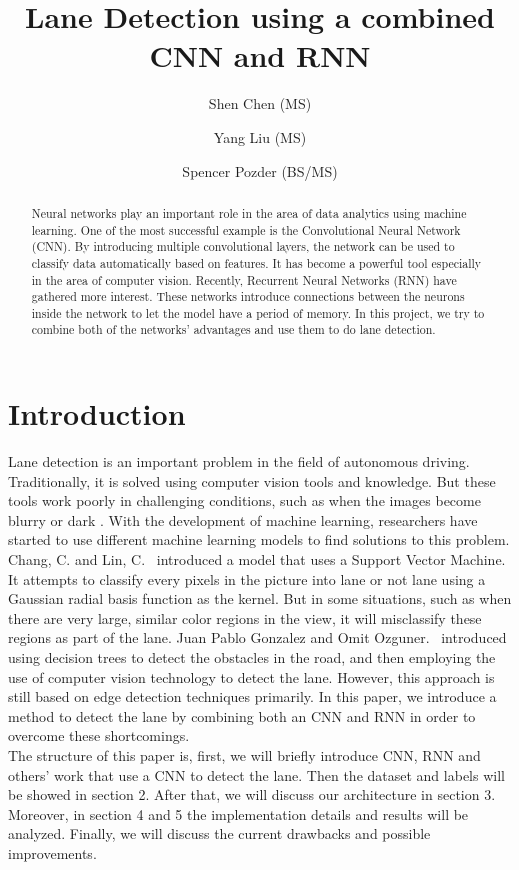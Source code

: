 \documentclass[runningheads]{llncs}
\begin{document}
%
\title{Lane Detection using a combined CNN and RNN}
%
%
\author{Shen Chen (MS)\and
Yang Liu (MS)\and
Spencer Pozder (BS/MS)}
%
\maketitle              %
%
\begin{abstract}
Neural networks play an important role in the area of data analytics using machine learning. One of the most successful example is the Convolutional Neural Network (CNN). By introducing multiple convolutional layers, the network can be used to classify data automatically based on features. It has become a powerful tool especially in the area of computer vision. Recently, Recurrent Neural Networks (RNN) have gathered more interest. These networks introduce connections between the neurons inside the network to let the model have a period of memory. In this project, we try to combine both of the networks' advantages and use them to do lane detection.
\end{abstract}
%
%
%
\section{Introduction}
Lane detection is an important problem in the field of autonomous driving. Traditionally, it is solved using computer vision tools and knowledge. But these tools work poorly in challenging conditions, such as when the images become blurry or dark . With the development of machine learning, researchers have started to use different machine learning models to find solutions to this problem. Chang, C. and Lin, C.~\cite{ref:1} introduced a model that uses a Support Vector Machine. It attempts to classify every pixels in the picture into lane or not lane using a Gaussian radial basis function as the kernel. But in some situations, such as when there are very large, similar color regions in the view, it will misclassify these regions as part of the lane. Juan Pablo Gonzalez and Omit Ozguner.~\cite{ref:2} introduced using decision trees to detect the obstacles in the road, and then employing the use of computer vision technology to detect the lane. However, this approach is still based on edge detection techniques primarily. In this paper, we introduce a method to detect the lane by combining both an CNN and RNN in order to overcome these shortcomings. \\
The structure of this paper is, first, we will briefly introduce CNN, RNN and others’ work that use a CNN to detect the lane. Then the dataset and labels will be showed in section 2. After that, we will discuss our architecture in section 3. Moreover, in section 4 and 5 the implementation details and results will be analyzed. Finally, we will discuss the current drawbacks and possible improvements.
\end{document}
